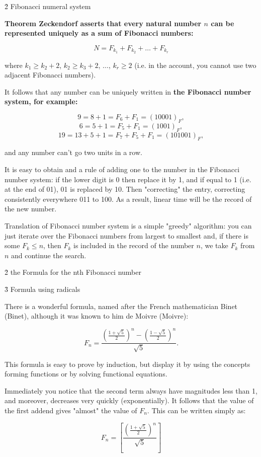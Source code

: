 \h2{ Fibonacci numeral system }

\bf{Theorem Zeckendorf} asserts that every natural number $n$ can be represented uniquely as a sum of Fibonacci numbers:

$$N = F_{k_1} + F_{k_2} + \ldots + F_{k_r}$$

where $k_1 \ge k_2+2$, $k_2 \ge k_3+2$, $\ldots$, $k_r \ge 2$ (i.e. in the account, you cannot use two adjacent Fibonacci numbers).

It follows that any number can be uniquely written in \bf{the Fibonacci number system}, for example:

$$ 9 = 8+1 = F_6 + F_1 = (10001)_F, $$
$$ 6 = 5+1 = F_5 + F_1 = (1001)_F, $$
$$ 19 = 13+5+1 = F_7 + F_5 + F_1 = (101001)_F, $$

and any number can't go two units in a row.

It is easy to obtain and a rule of adding one to the number in the Fibonacci number system: if the lower digit is 0 then replace it by 1, and if equal to 1 (i.e. at the end of 01), 01 is replaced by 10. Then "correcting" the entry, correcting consistently everywhere 011 to 100. As a result, linear time will be the record of the new number.

Translation of Fibonacci number system is a simple "greedy" algorithm: you can just iterate over the Fibonacci numbers from largest to smallest and, if there is some $F_k \le n$, then $F_k$ is included in the record of the number $n$, we take $F_k$ from $n$ and continue the search.


\h2{ the Formula for the nth Fibonacci number }


\h3{ Formula using radicals }

There is a wonderful formula, named after the French mathematician Binet (Binet), although it was known to him de Moivre (Moivre):

$$ F_n = \frac{ \left( \frac{1+\sqrt{5}}{2} \right)^n - \left( \frac{1-\sqrt{5}}{2} \right)^n }{ \sqrt{5} }. $$

This formula is easy to prove by induction, but display it by using the concepts forming functions or by solving functional equations.

Immediately you notice that the second term always have magnitudes less than 1, and moreover, decreases very quickly (exponentially). It follows that the value of the first addend gives "almost" the value of $F_n$. This can be written simply as:

$$F_n = \left[ \frac{ \left( \frac{1+\sqrt{5}}{2} \right)^n }{ \sqrt{5} } \right]$$

